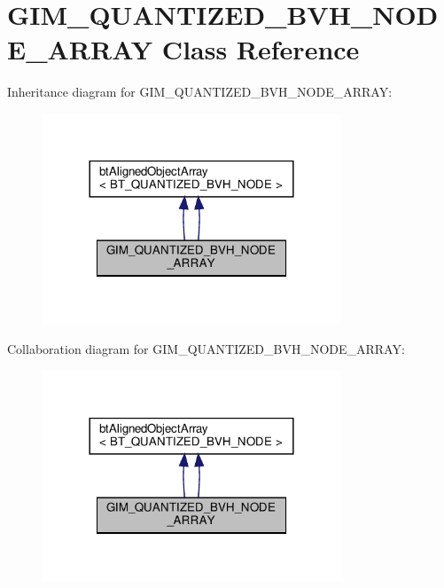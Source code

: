 \hypertarget{classGIM__QUANTIZED__BVH__NODE__ARRAY}{}\section{G\+I\+M\+\_\+\+Q\+U\+A\+N\+T\+I\+Z\+E\+D\+\_\+\+B\+V\+H\+\_\+\+N\+O\+D\+E\+\_\+\+A\+R\+R\+AY Class Reference}
\label{classGIM__QUANTIZED__BVH__NODE__ARRAY}


Inheritance diagram for G\+I\+M\+\_\+\+Q\+U\+A\+N\+T\+I\+Z\+E\+D\+\_\+\+B\+V\+H\+\_\+\+N\+O\+D\+E\+\_\+\+A\+R\+R\+AY\+:
\nopagebreak
\begin{figure}[H]
\begin{center}
\leavevmode
\includegraphics[width=252pt]{classGIM__QUANTIZED__BVH__NODE__ARRAY__inherit__graph}
\end{center}
\end{figure}


Collaboration diagram for G\+I\+M\+\_\+\+Q\+U\+A\+N\+T\+I\+Z\+E\+D\+\_\+\+B\+V\+H\+\_\+\+N\+O\+D\+E\+\_\+\+A\+R\+R\+AY\+:
\nopagebreak
\begin{figure}[H]
\begin{center}
\leavevmode
\includegraphics[width=252pt]{classGIM__QUANTIZED__BVH__NODE__ARRAY__coll__graph}
\end{center}
\end{figure}
